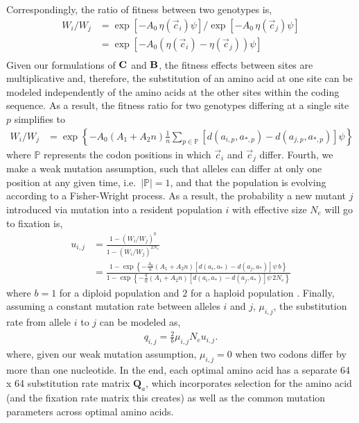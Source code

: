 \documentclass{article}
\newcommand{\Cost}{\ensuremath{\text{\textbf{C}}}\xspace}
\newcommand{\Func}{\ensuremath{\text{\textbf{B}}}\xspace}
\newcommand{\Ne}{\ensuremath{{N_e}}\xspace} %
\newcommand{\Qmatrix}{\ensuremath{\mathbf{Q}}\xspace}
\newcommand{\Qmatrixa}{\ensuremath{\Qmatrix_a}\xspace}
\newcommand{\aip}{\ensuremath{a_{i,p}}\xspace}
\newcommand{\ajp}{\ensuremath{a_{j,p}}\xspace}
\newcommand{\aopt}{\ensuremath{a_*}\xspace}
\newcommand{\aoptp}{\ensuremath{a_{*,p}}\xspace}
\newcommand{\cveci}{\ensuremath{\cvec_i}\xspace}
\newcommand{\cvecj}{\ensuremath{\cvec_j}\xspace}
\newcommand{\cvec}{\ensuremath{\Vec{c}}\xspace}
\newcommand{\muij}{\ensuremath{\mu_{i,j}}\xspace}
\newcommand{\setP}{\ensuremath{\mathbb{P}}\xspace}
\begin{document}
Correspondingly, the ratio of fitness between two genotypes is,
\begin{align*}
  W_i/W_j &=  \exp\left[- A_0 \, \eta(\cveci) \psi\right]/\exp\left[- A_0 \, \eta(\cvecj) \psi\right]\\
  &=  \exp\left[- A_0 \left(\eta(\cveci)- \eta(\cvecj)\right) \psi\right]\\
\end{align*}
Given our formulations of \Cost and \Func, the fitness effects between sites are multiplicative and, therefore, the substitution of an amino acid at one site can be modeled independently of the amino acids at the other sites within the coding sequence.
As a result, the fitness ratio for two genotypes differing at a single site $p$ simplifies to
\begin{align}
 W_i/W_j  &= \exp\left\{- A_0 \left(A_1 + A_2 n\right) \frac{1}{n} \sum_{p \in \setP} \left[d\left(\aip,\aoptp\right) - d\left(\ajp,\aoptp\right)\right] \psi \right\}
\end{align}
where \setP represents the codon positions in which \cveci and \cvecj differ.
Fourth, we make a weak mutation assumption, such that alleles can differ at only one position at any given time, i.e.~$|\setP| = 1$, and that the population is evolving according to a Fisher-Wright process.
As a result, the probability a new mutant $j$ introduced via mutation into a resident population $i$ with effective size \Ne will go to fixation is,
\begin{align*}
  u_{i,j} &=  \frac{1 - \left(W_i/W_j\right)^b}{1 - \left(W_i/W_j\right)^{2 \Ne}}\\
   &= \frac{1- \exp\left\{- \frac{A_0}{n} \left(A_1 + A_2 n\right) \left[d\left(a_i,\aopt\right) - d\left(a_j,\aopt\right)\right] \psi \,  b\right\}}  {1-\exp\left\{- \frac{q}{n} \left(A_1 + A_2 n\right) \left[d\left(a_i,\aopt\right) - d\left(a_j,\aopt\right)\right] \psi \, 2\Ne\right\}}
\end{align*}
where $b=1$ for a diploid population and $2$ for a haploid population \citep{Kimura1962,Wright1969,Iwasa1988,BergAndLassig2003,SellaAndHirsh2005}.
Finally, assuming a constant mutation rate between alleles $i$ and $j$, $\muij$, the substitution rate from allele $i$ to $j$ can be modeled as,
\begin{align*}
  q_{i,j} = \frac{2}{b} \muij \Ne u_{i,j}.
\end{align*}
where, given our weak mutation assumption, $\muij = 0$ when two codons differ by more than one nucleotide.
In the end, each optimal amino acid has a separate 64 x 64 substitution rate matrix \Qmatrixa, which incorporates selection for the amino acid (and the fixation rate matrix this creates) as well as the common mutation parameters across optimal amino acids.
\end{document}
